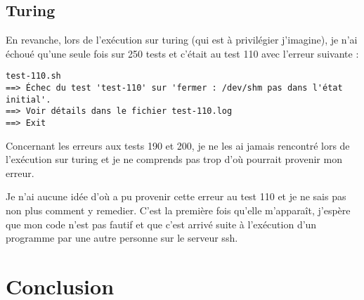 \documentclass[a4paper]{article}
\begin{document}
\subsection{Turing}

En revanche, lors de l'exécution sur turing (qui est à privilégier j'imagine), je n'ai échoué qu'une seule fois sur 250 tests et c'était au test 110 avec l'erreur suivante :
\begin{verbatim}
test-110.sh
==> Échec du test 'test-110' sur 'fermer : /dev/shm pas dans l'état initial'.
==> Voir détails dans le fichier test-110.log
==> Exit
\end{verbatim}

Concernant les erreurs aux tests 190 et 200, je ne les ai jamais rencontré lors de l'exécution sur turing et je ne comprends pas trop d'où pourrait provenir mon erreur.
\smallskip \par Je n'ai aucune idée d'où a pu provenir cette erreur au test 110 et je ne sais pas non plus comment y remedier. C'est la première fois qu'elle m'apparaît, j'espère que mon code n'est pas fautif et que c'est arrivé suite à l'exécution d'un programme par une autre personne sur le serveur ssh.

\newpage
\section{Conclusion}
\end{document}
